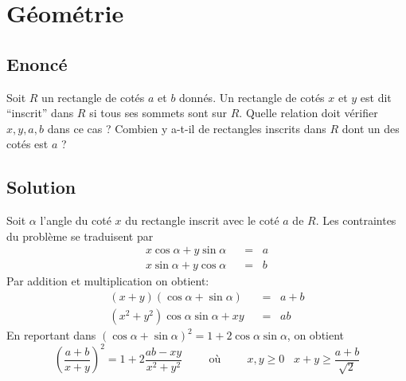 \documentclass{article}
\newcommand{\eqnsymb}[1]{\;\;{#1}\;\;}
\newenvironment{statement}{\subsection{Enoncé}}{\pagebreak}
\newenvironment{solution}{\subsection{Solution}}{\pagebreak}
\begin{document}
\section{Géométrie}
\begin{statement}
Soit $R$ un rectangle de cotés $a$ et $b$ donnés. Un rectangle de cotés $x$ et $y$ est dit ``inscrit'' dans $R$ si tous ses sommets sont sur $R$. Quelle relation doit vérifier $x,y,a,b$ dans ce cas ? Combien y a-t-il de rectangles inscrits dans $R$ dont un des cotés est $a$ ?
\end{statement}
\begin{solution}
\begin{center}
\end{center}
Soit $\alpha$ l'angle du coté $x$ du rectangle inscrit avec le coté $a$ de $R$. Les contraintes du problème se traduisent par
\begin{align*}
x\cos\alpha+y\sin\alpha & \eqnsymb{=} a\\
x\sin\alpha+y\cos\alpha & \eqnsymb{=} b
\end{align*}
Par addition et multiplication on obtient:
\begin{align*}
(x+y)(\cos\alpha+\sin\alpha) & \eqnsymb{=} a+b\\
(x^2+y^2)\cos\alpha\sin\alpha+xy & \eqnsymb{=} ab
\end{align*}
En reportant dans $(\cos\alpha+\sin\alpha)^2=1+2\cos\alpha\sin\alpha$, on obtient
\[
\left(\frac{a+b}{x+y}\right)^2 = 1+2\frac{ab-xy}{x^2+y^2}
\hspace{1cm}\textrm{où}\hspace{1cm}
x,y\geq0 \;\;\; x+y \geq \frac{a+b}{\sqrt{2}}
\]
\end{solution}
\end{document}
